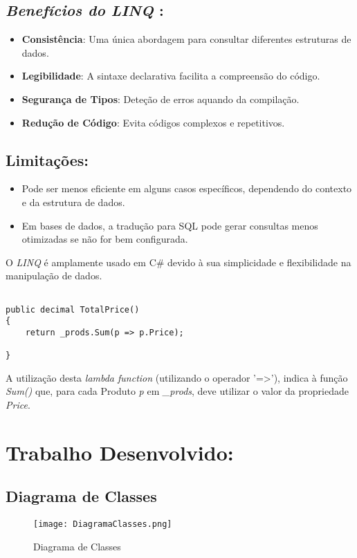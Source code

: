 \documentclass[11pt]{scrartcl} %
\begin{document}
\subsection{\textit{Benefícios do \textit{LINQ}} :}
\begin{itemize}
	\item \textbf{Consistência}: Uma única abordagem para consultar diferentes estruturas de dados.
	\item \textbf{Legibilidade}: A sintaxe declarativa facilita a compreensão do código.
	\item \textbf{Segurança de Tipos}: Deteção de erros aquando da compilação.
	\item \textbf{Redução de Código}: Evita códigos complexos e repetitivos.	
\end{itemize}

\subsection{Limitações:}
\begin{itemize}
	\item Pode ser menos eficiente em alguns casos específicos, dependendo do contexto e da estrutura de dados.
	\item Em bases de dados, a tradução para SQL pode gerar consultas menos otimizadas se não for bem configurada.	
\end{itemize}

O \textit{LINQ} é amplamente usado em C\# devido à sua simplicidade e flexibilidade na manipulação de dados.

\newpage

\begin{lstlisting}[language={[Sharp]C}, caption={A Classe Cliente}, label={Classe Cliente}]
	
public decimal TotalPrice()
{
	return _prods.Sum(p => p.Price);
	
}
\end{lstlisting}

A utilização desta \textit{lambda function} (utilizando o operador '=>'), indica à função \textit{Sum()} que, para cada Produto \textit{p} em \textit{\_prods}, deve utilizar o valor da propriedade \textit{Price}.

\newpage

\section{Trabalho Desenvolvido:}
\subsection{Diagrama de Classes}
\begin{figure}[h] %
	\centering
	\texttt{[image: DiagramaClasses.png]} %
	\caption{Diagrama de Classes}
\end{figure}
\end{document}
